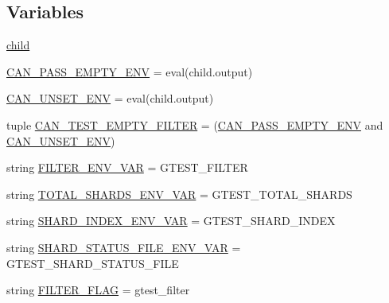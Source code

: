 \subsection*{Variables}
\begin{DoxyCompactItemize}
\item 
\hyperlink{namespacegtest__filter__unittest_a1bb380432b61dc7972355aeb5c457c03}{child}
\item 
\hyperlink{namespacegtest__filter__unittest_a3ac12d5141273a483e2fd6d44ab2eef0}{C\+A\+N\+\_\+\+P\+A\+S\+S\+\_\+\+E\+M\+P\+T\+Y\+\_\+\+E\+NV} = eval(child.\+output)
\item 
\hyperlink{namespacegtest__filter__unittest_ab9e86ba00496d09ea6830a60e3eb3cc0}{C\+A\+N\+\_\+\+U\+N\+S\+E\+T\+\_\+\+E\+NV} = eval(child.\+output)
\item 
tuple \hyperlink{namespacegtest__filter__unittest_a7afca8c162042da19f58cb569805d627}{C\+A\+N\+\_\+\+T\+E\+S\+T\+\_\+\+E\+M\+P\+T\+Y\+\_\+\+F\+I\+L\+T\+ER} = (\hyperlink{namespacegtest__filter__unittest_a3ac12d5141273a483e2fd6d44ab2eef0}{C\+A\+N\+\_\+\+P\+A\+S\+S\+\_\+\+E\+M\+P\+T\+Y\+\_\+\+E\+NV} and \hyperlink{namespacegtest__filter__unittest_ab9e86ba00496d09ea6830a60e3eb3cc0}{C\+A\+N\+\_\+\+U\+N\+S\+E\+T\+\_\+\+E\+NV})
\item 
string \hyperlink{namespacegtest__filter__unittest_a3dbe99165209787d4d138d30673c95f5}{F\+I\+L\+T\+E\+R\+\_\+\+E\+N\+V\+\_\+\+V\+AR} = \textquotesingle{}G\+T\+E\+S\+T\+\_\+\+F\+I\+L\+T\+ER\textquotesingle{}
\item 
string \hyperlink{namespacegtest__filter__unittest_a3b9a50b994f774c1cebbc52971708e4e}{T\+O\+T\+A\+L\+\_\+\+S\+H\+A\+R\+D\+S\+\_\+\+E\+N\+V\+\_\+\+V\+AR} = \textquotesingle{}G\+T\+E\+S\+T\+\_\+\+T\+O\+T\+A\+L\+\_\+\+S\+H\+A\+R\+DS\textquotesingle{}
\item 
string \hyperlink{namespacegtest__filter__unittest_a082d5120f29f56d497db94401d773ca7}{S\+H\+A\+R\+D\+\_\+\+I\+N\+D\+E\+X\+\_\+\+E\+N\+V\+\_\+\+V\+AR} = \textquotesingle{}G\+T\+E\+S\+T\+\_\+\+S\+H\+A\+R\+D\+\_\+\+I\+N\+D\+EX\textquotesingle{}
\item 
string \hyperlink{namespacegtest__filter__unittest_acc2e06353cabc6015c98bc37413a63ee}{S\+H\+A\+R\+D\+\_\+\+S\+T\+A\+T\+U\+S\+\_\+\+F\+I\+L\+E\+\_\+\+E\+N\+V\+\_\+\+V\+AR} = \textquotesingle{}G\+T\+E\+S\+T\+\_\+\+S\+H\+A\+R\+D\+\_\+\+S\+T\+A\+T\+U\+S\+\_\+\+F\+I\+LE\textquotesingle{}
\item 
string \hyperlink{namespacegtest__filter__unittest_a90fceef31e3329f712cd41244c5e923d}{F\+I\+L\+T\+E\+R\+\_\+\+F\+L\+AG} = \textquotesingle{}gtest\+\_\+filter\textquotesingle{}

\end{DoxyCompactItemize}
